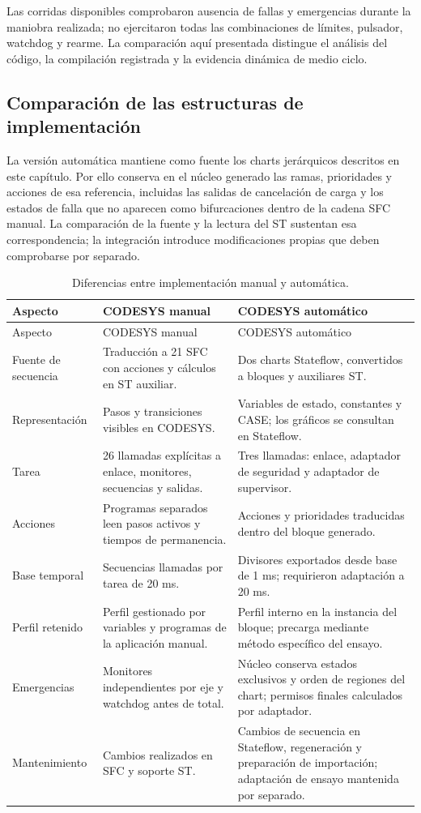 \documentclass[a4paper,10pt,onecolumn,journal]{ieeeconf}
\numberwithin{equation}{section}
\begin{document}
Las corridas disponibles comprobaron ausencia de fallas y emergencias durante la maniobra realizada; no ejercitaron todas las combinaciones de límites, pulsador, watchdog y rearme. La comparación aquí presentada distingue el análisis del código, la compilación registrada y la evidencia dinámica de medio ciclo.


\subsection{Comparación de las estructuras de implementación}
La versión automática mantiene como fuente los charts jerárquicos descritos en este capítulo. Por ello conserva en el núcleo generado las ramas, prioridades y acciones de esa referencia, incluidas las salidas de cancelación de carga y los estados de falla que no aparecen como bifurcaciones dentro de la cadena SFC manual. La comparación de la fuente y la lectura del ST sustentan esa correspondencia; la integración introduce modificaciones propias que deben comprobarse por separado.

{\footnotesize
\begin{longtable}{L{3.0cm} L{5.8cm} L{5.8cm}}
\caption{Diferencias entre implementación manual y automática.}\label{tab:manual_auto_st}\\
\toprule Aspecto & CODESYS manual & CODESYS automático\\\midrule
\endfirsthead
\toprule Aspecto & CODESYS manual & CODESYS automático\\\midrule
\endhead
Fuente de secuencia & Traducción a 21 SFC con acciones y cálculos en ST auxiliar. & Dos charts Stateflow, convertidos a bloques y auxiliares ST.\\
Representación & Pasos y transiciones visibles en CODESYS. & Variables de estado, constantes y CASE; los gráficos se consultan en Stateflow.\\
Tarea & 26 llamadas explícitas a enlace, monitores, secuencias y salidas. & Tres llamadas: enlace, adaptador de seguridad y adaptador de supervisor.\\
Acciones & Programas separados leen pasos activos y tiempos de permanencia. & Acciones y prioridades traducidas dentro del bloque generado.\\
Base temporal & Secuencias llamadas por tarea de 20 ms. & Divisores exportados desde base de 1 ms; requirieron adaptación a 20 ms.\\
Perfil retenido & Perfil gestionado por variables y programas de la aplicación manual. & Perfil interno en la instancia del bloque; precarga mediante método específico del ensayo.\\
Emergencias & Monitores independientes por eje y watchdog antes de total. & Núcleo conserva estados exclusivos y orden de regiones del chart; permisos finales calculados por adaptador.\\
Mantenimiento & Cambios realizados en SFC y soporte ST. & Cambios de secuencia en Stateflow, regeneración y preparación de importación; adaptación de ensayo mantenida por separado.\\
\bottomrule
\end{longtable}}
\end{document}
